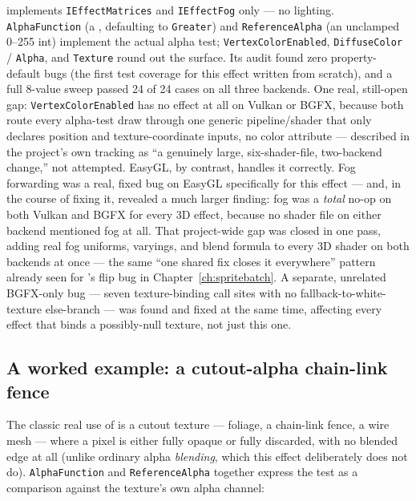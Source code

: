  implements \texttt{IEffectMatrices} and \texttt{IEffectFog} only
--- no lighting. \texttt{AlphaFunction} (a , defaulting to
\texttt{Greater}) and \texttt{ReferenceAlpha} (an unclamped 0--255 int) implement the actual
alpha test; \texttt{VertexColorEnabled}, \texttt{DiffuseColor} / \texttt{Alpha}, and
\texttt{Texture} round out the surface. Its audit found zero property-default bugs (the
first test coverage for this effect written from scratch), and a full 8-value
 sweep passed 24 of 24 cases on all three backends. One real,
still-open gap: \texttt{VertexColorEnabled} has no effect at all on Vulkan or BGFX, because
both route every alpha-test draw through one generic pipeline/shader that only declares
position and texture-coordinate inputs, no color attribute --- described in the project's
own tracking as ``a genuinely large, six-shader-file, two-backend change,'' not attempted.
EasyGL, by contrast, handles it correctly. Fog forwarding was a real, fixed bug on EasyGL
specifically for this effect --- and, in the course of fixing it, revealed a much larger
finding: fog was a \emph{total} no-op on both Vulkan and BGFX for every 3D effect, because no
shader file on either backend mentioned fog at all. That project-wide gap was closed in one
pass, adding real fog uniforms, varyings, and blend formula to every 3D shader on both
backends at once --- the same ``one shared fix closes it everywhere'' pattern already seen
for 's flip bug in Chapter~\ref{ch:spritebatch}. A separate, unrelated
BGFX-only bug --- seven texture-binding call sites with no fallback-to-white-texture
else-branch --- was found and fixed at the same time, affecting every effect that binds a
possibly-null texture, not just this one.

\subsection{A worked example: a cutout-alpha chain-link fence}

The classic real use of  is a cutout texture --- foliage, a
chain-link fence, a wire mesh --- where a pixel is either fully opaque or fully discarded, with
no blended edge at all (unlike ordinary alpha \emph{blending}, which this effect deliberately
does not do). \texttt{AlphaFunction} and \texttt{ReferenceAlpha} together express the test as a
comparison against the texture's own alpha channel:

